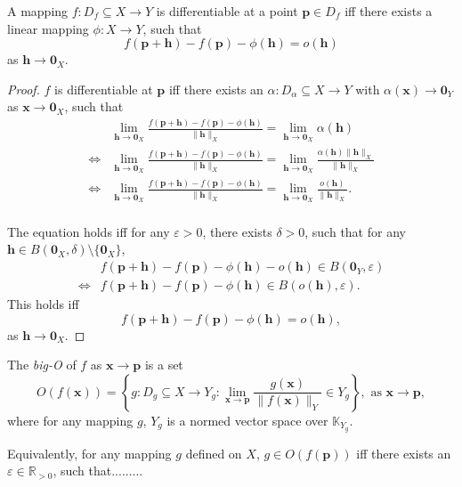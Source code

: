\documentclass{article}
\begin{document}
\begin{proposition}
	A mapping $f: D_f \subseteq X \to Y$ is differentiable at a point $\mathbf p \in D_f$ iff there exists a linear mapping $\phi: X \to Y$, such that
	$$
	f(\mathbf p + \mathbf h) - f(\mathbf p) - \phi(\mathbf h) = o(\mathbf h)
	$$
	as $\mathbf h \to \mathbf 0_X$.
	
	\begin{proof}
		$f$ is differentiable at $\mathbf p$ iff there exists an $\alpha : D_\alpha \subseteq X \to Y$ with $\alpha(\mathbf x) \to \mathbf 0_Y$ as $\mathbf x \to \mathbf 0_X$, such that
		$$
		\begin{aligned}
			& \lim_{\mathbf h \to \mathbf 0_X} \frac{f(\mathbf p + \mathbf h) - f(\mathbf p) - \phi(\mathbf h)}{\| \mathbf h \|_X} = \lim_{\mathbf h \to \mathbf 0_X} \alpha(\mathbf h) \\
			\iff & \lim_{\mathbf h \to \mathbf 0_X} \frac{f(\mathbf p + \mathbf h) - f(\mathbf p) - \phi(\mathbf h)}{\| \mathbf h \|_X} = \lim_{\mathbf h \to \mathbf 0_X} \frac{\alpha (\mathbf h) \| \mathbf h \|_X}{\| \mathbf h \|_X} \\
			\iff & \lim_{\mathbf h \to \mathbf 0_X} \frac{f(\mathbf p + \mathbf h) - f(\mathbf p) - \phi(\mathbf h)}{\| \mathbf h \|_X} = \lim_{\mathbf h \to \mathbf 0_X} \frac{o(\mathbf h)}{\| \mathbf h \|_X}. \\
		\end{aligned}
		$$
		
		The equation holds iff for any $\varepsilon > 0$, there exists $\delta > 0$, such that for any $\mathbf h \in B(\mathbf 0_X, \delta) \setminus \{\mathbf 0_X\}$,
		$$
		\begin{aligned}
			& f(\mathbf p + \mathbf h) - f(\mathbf p) - \phi (\mathbf h) - o(\mathbf h) \in B(\mathbf 0_Y, \varepsilon) \\
			\iff & f(\mathbf p + \mathbf h) - f(\mathbf p) - \phi(\mathbf h) \in B(o(\mathbf h), \varepsilon).
		\end{aligned}
		$$
		This holds iff
		$$
		f(\mathbf p + \mathbf h) - f(\mathbf p) - \phi(\mathbf h) = o(\mathbf h),
		$$
		as $\mathbf h \to \mathbf 0_X$.
	\end{proof}
\end{proposition}


\begin{definition}
	The \textit{big-O} of $f$ as $\mathbf x \to \mathbf p$ is a set
	$$
	O(f(\mathbf x)) = \left\{
		g: D_g \subseteq X \to Y_g : \lim_{\mathbf x \to \mathbf p} \frac{g(\mathbf x)}{\| f(\mathbf x) \|_Y} \in Y_g
	\right\}, \text{ as $\mathbf x \to \mathbf p$},
	$$
	where for any mapping $g$, $Y_g$ is a normed vector space over $\mathbb K_{Y_g}$.
	
	Equivalently, for any mapping $g$ defined on $X$, $g \in O(f(\mathbf p))$ iff there exists an $\varepsilon \in \mathbb R_{> 0}$, such that.........
\end{definition}
\end{document}
